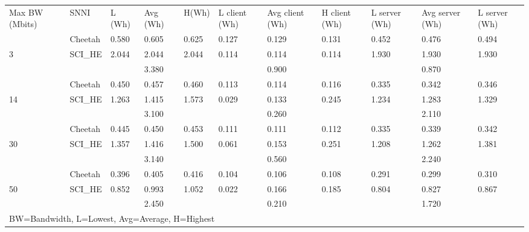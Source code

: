 \begin{tabular}{lllllllllll}
Max BW (Mbits) & SNNI    & L (Wh) & Avg (Wh) & H(Wh) & L client (Wh) & Avg client (Wh) & H client (Wh) & L server (Wh) & Avg server (Wh) & L server (Wh) \\
               & Cheetah & 0.580  & 0.605    & 0.625 & 0.127         & 0.129           & 0.131         & 0.452         & 0.476           & 0.494         \\
3              & SCI\_HE & 2.044  & 2.044    & 2.044 & 0.114         & 0.114           & 0.114         & 1.930         & 1.930           & 1.930         \\
               &         &        & 3.380    &       &               & 0.900           &               &               & 0.870           &               \\
               & Cheetah & 0.450  & 0.457    & 0.460 & 0.113         & 0.114           & 0.116         & 0.335         & 0.342           & 0.346         \\
14             & SCI\_HE & 1.263  & 1.415    & 1.573 & 0.029         & 0.133           & 0.245         & 1.234         & 1.283           & 1.329         \\
               &         &        & 3.100    &       &               & 0.260           &               &               & 2.110           &               \\
               & Cheetah & 0.445  & 0.450    & 0.453 & 0.111         & 0.111           & 0.112         & 0.335         & 0.339           & 0.342         \\
30             & SCI\_HE & 1.357  & 1.416    & 1.500 & 0.061         & 0.153           & 0.251         & 1.208         & 1.262           & 1.381         \\
               &         &        & 3.140    &       &               & 0.560           &               &               & 2.240           &               \\
               & Cheetah & 0.396  & 0.405    & 0.416 & 0.104         & 0.106           & 0.108         & 0.291         & 0.299           & 0.310         \\
50             & SCI\_HE & 0.852  & 0.993    & 1.052 & 0.022         & 0.166           & 0.185         & 0.804         & 0.827           & 0.867         \\
               &         &        & 2.450    &       &               & 0.210           &               &               & 1.720           &               \\
\multicolumn{11}{l}{BW=Bandwidth, L=Lowest, Avg=Average, H=Highest}                                                                                     
\end{tabular}